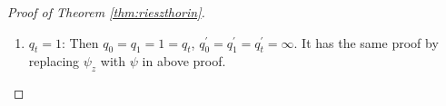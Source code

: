 \begin{proof}[Proof of Theorem \ref{thm:rieszthorin}]
\begin{enumerate}[label=(\Roman*)]
\begin{enumerate}[label=\theenumi-\arabic{*}]
\begin{enumerate}[label=(\roman*)]
\begin{equation*}
\begin{aligned}
						& =\sum_{j=1}^M\left|a_j\right|^{p_t} \mu\left(A_j\right)=\|\phi\|_{L^{p_t}(X)}^{p_t}=1
					\end{aligned}
				\end{equation*}
				Moreover, by similar calculation, we have
				\begin{equation*}
					\left\|\psi_{i s}\right\|_{L^{q_0^{\prime}}(Y)}=\left\|\psi_{1+i s}\right\|_{L^{q_1^{\prime}}(Y)}=1
				\end{equation*}
				Then by the H\"older's Inequality,
				\begin{equation*}
					\begin{aligned}
						|F(i s)| & =\left|\left\langle T \phi_{i s}, \psi_{i s}\right\rangle\right| \leq\left\|T \phi_{i s}\right\|_{L^{q_0}(Y)}\left\|\psi_{i s}\right\|_{L^{q_0^{\prime}}(Y)} \\
						& \leq M_0\left\|\phi_{i s}\right\|_{L^{p_0}(X)}\left\|\psi_{i s}\right\|_{L^{q_0^{\prime}}(Y)}=M_0
					\end{aligned}
				\end{equation*}
				and
				\begin{equation*}
					\begin{aligned}
						|F(1+i s)| & =\left|\left\langle T \phi_{1+i s}, \psi_{1+i s}\right\rangle\right| \leq\left\|T \phi_{1+i s}\right\|_{L^{q_1}(Y)}\left\|\psi_{1+i s}\right\|_{L^{q_1^{\prime}}(Y)} \\
						& \leq M_1\left\|\phi_{1+i s}\right\|_{L^{p_1}(X)}\left\|\psi_{1+i s}\right\|_{L^{q_1^{\prime}}(Y)}=M_1
					\end{aligned}
				\end{equation*}
				Therefore, Hadamard Three-line Theorem implies
				\begin{equation*}
					|\langle T \phi, \psi\rangle|=\left|\left\langle T \phi_t, \psi_t\right\rangle\right|=|F(t)|=|F(t+i 0)| \leq M_0^{1-t} M_1^t
				\end{equation*}

				\item $q_t = 1$: Then $q_0 = q_1 = 1 = q_t$, $q_0^{\prime}=q_1^{\prime}=q_t^{\prime}=\infty$. It has the same proof by replacing $\psi_z$ with $\psi$ in above proof.
			\end{enumerate}


\end{enumerate}
\end{enumerate}
\end{proof}
